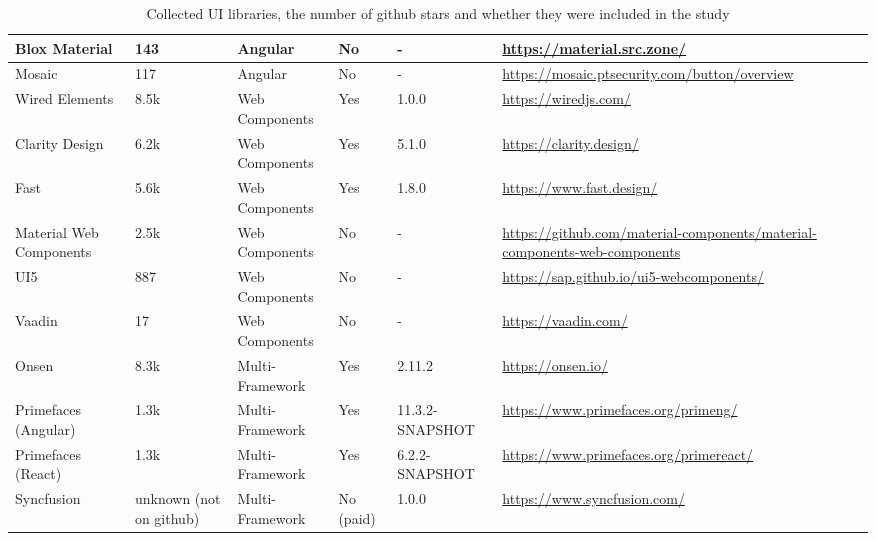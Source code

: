 \begin{table*}[t]
\begin{tabularx}{\textwidth}{l|l|l|l|l|X}
		Blox Material           & 143                     & Angular               & No                & -                & \url{https://material.src.zone/}                                                 \\ \hline
		Mosaic                  & 117                     & Angular               & No                & -                & \url{https://mosaic.ptsecurity.com/button/overview }                             \\ \hline
		Wired Elements          & 8.5k                    & Web Components        & Yes               & 1.0.0            & \url{https://wiredjs.com/}                                                       \\ \hline
		Clarity Design          & 6.2k                    & Web Components        & Yes               & 5.1.0            & \url{https://clarity.design/}                                                    \\ \hline
		Fast                    & 5.6k                    & Web Components        & Yes               & 1.8.0            & \url{https://www.fast.design/}                                                   \\ \hline
		Material Web Components & 2.5k                    & Web Components        & No                & -                & \url{https://github.com/material-components/material-components-web-components } \\ \hline
		UI5                     & 887                     & Web Components        & No                & -                & \url{https://sap.github.io/ui5-webcomponents/}                                   \\ \hline
		Vaadin                  & 17                      & Web Components        & No                & -                & \url{https://vaadin.com/}                                                        \\ \hline
		Onsen                   & 8.3k                    & Multi-Framework       & Yes               & 2.11.2           & \url{https://onsen.io/}                                                          \\ \hline
		Primefaces (Angular)    & 1.3k                    & Multi-Framework       & Yes               & 11.3.2-SNAPSHOT  & \url{https://www.primefaces.org/primeng/}                                        \\ \hline
		Primefaces (React)      & 1.3k                    & Multi-Framework       & Yes               & 6.2.2-SNAPSHOT   & \url{https://www.primefaces.org/primereact/}                                     \\ \hline
		Syncfusion              & unknown (not on github) & Multi-Framework       & No (paid)         & 1.0.0            & \url{https://www.syncfusion.com/}
	\end{tabularx}
	\caption{Collected UI libraries, the number of github stars and whether they were included in the study}
	\label{tab:design:ui-libraries}
\end{table*}
